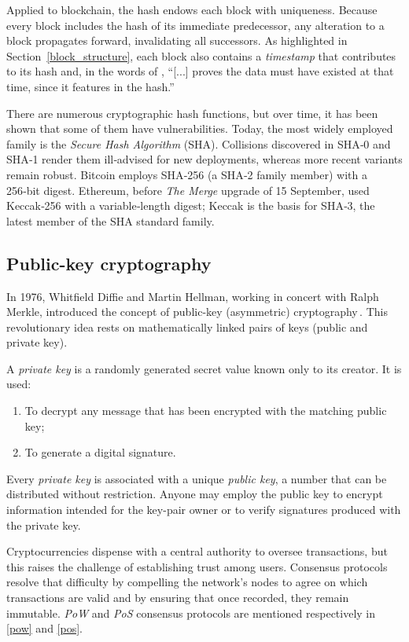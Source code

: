 Applied to blockchain, the hash endows each block with uniqueness. Because every block includes the hash of its immediate predecessor, any alteration to a block propagates forward, invalidating all successors. As highlighted in Section~\ref{block_structure}, each block also contains a \textit{timestamp} that contributes to its hash and, in the words of \cite{bitcoin}, “[...] proves the data must have existed at that time, since it features in the hash.”

There are numerous cryptographic hash functions, but over time, it has been shown that some of them have vulnerabilities. Today, the most widely employed family is the \textit{Secure Hash Algorithm} (SHA). Collisions discovered in SHA‑0 and SHA‑1 render them ill‑advised for new deployments, whereas more recent variants remain robust. Bitcoin employs SHA‑256 (a SHA‑2 family member) with a 256‑bit digest. Ethereum, before \textit{The Merge} upgrade of 15 September, used Keccak‑256 with a variable‑length digest; Keccak is the basis for SHA‑3, the latest member of the SHA standard family.

\subsection{Public-key cryptography} \makeatletter{}\makeatother
\label{pubkey}
In 1976, Whitfield Diffie and Martin Hellman, working in concert with Ralph Merkle, introduced the concept of public-key (asymmetric) cryptography\,\cite{AsymCrytt}.  
This revolutionary idea rests on mathematically linked pairs of keys (public and private key).

A \textit{private key} is a randomly generated secret value known only to its creator.  
It is used:
\begin{enumerate}[label=\textit{(\roman*)}]
 \item To decrypt any message that has been encrypted with the matching public key; 
 \item To generate a digital signature.
\end{enumerate}

Every \textit{private key} is associated with a unique \textit{public key}, a number that can be distributed without restriction.  
Anyone may employ the public key to encrypt information intended for the key-pair owner or to verify signatures produced with the private key.

Cryptocurrencies dispense with a central authority to oversee transactions, but this raises the challenge of establishing trust among users.  
Consensus protocols resolve that difficulty by compelling the network's nodes to agree on which transactions are valid and by ensuring that once recorded, they remain immutable. \textit{PoW} and \textit{PoS} consensus protocols are mentioned respectively in \ref{pow} and \ref{pos}.


